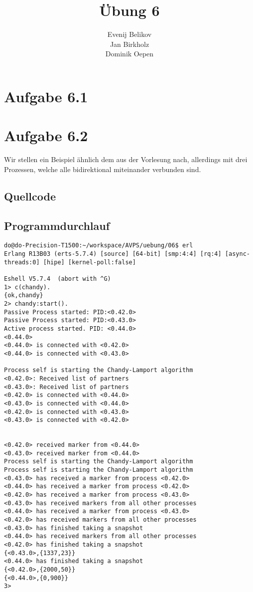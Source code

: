 \documentclass{scrartcl}
\begin{document}
\title{Übung 6}
\author{Evenij Belikov\\Jan Birkholz\\Dominik Oepen}
\maketitle

\section*{Aufgabe 6.1}

\section*{Aufgabe 6.2}
Wir stellen ein Beispiel ähnlich dem aus der Vorlesung nach, allerdings mit drei Prozessen,
welche alle bidirektional miteinander verbunden sind.

\subsection*{Quellcode}


\subsection*{Programmdurchlauf}
\begin{verbatim}
do@do-Precision-T1500:~/workspace/AVPS/uebung/06$ erl
Erlang R13B03 (erts-5.7.4) [source] [64-bit] [smp:4:4] [rq:4] [async-threads:0] [hipe] [kernel-poll:false]

Eshell V5.7.4  (abort with ^G)
1> c(chandy).
{ok,chandy}
2> chandy:start().
Passive Process started: PID:<0.42.0>
Passive Process started: PID:<0.43.0>
Active process started. PID: <0.44.0>
<0.44.0>
<0.44.0> is connected with <0.42.0>
<0.44.0> is connected with <0.43.0>
   
Process self is starting the Chandy-Lamport algorithm
<0.42.0>: Received list of partners
<0.43.0>: Received list of partners
<0.42.0> is connected with <0.44.0>
<0.43.0> is connected with <0.44.0>
<0.42.0> is connected with <0.43.0>
<0.43.0> is connected with <0.42.0>
   
   
<0.42.0> received marker from <0.44.0>
<0.43.0> received marker from <0.44.0>
Process self is starting the Chandy-Lamport algorithm
Process self is starting the Chandy-Lamport algorithm
<0.43.0> has received a marker from process <0.42.0>
<0.44.0> has received a marker from process <0.42.0>
<0.42.0> has received a marker from process <0.43.0>
<0.43.0> has received markers from all other processes
<0.44.0> has received a marker from process <0.43.0>
<0.42.0> has received markers from all other processes
<0.43.0> has finished taking a snapshot
<0.44.0> has received markers from all other processes
<0.42.0> has finished taking a snapshot
{<0.43.0>,{1337,23}}
<0.44.0> has finished taking a snapshot
{<0.42.0>,{2000,50}}
{<0.44.0>,{0,900}}
3> 
\end{verbatim}
\end{document}
